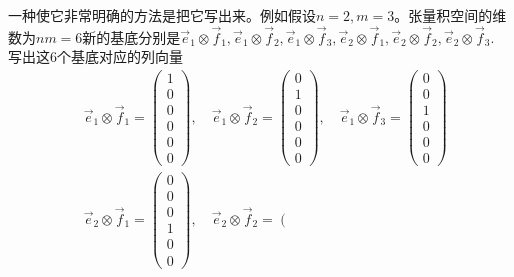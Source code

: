 \documentclass[a4paper,11pt]{article}
\begin{document}
    一种使它非常明确的方法是把它写出来。例如假设$n=2,m=3$。张量积空间的维数为$nm=6$新的基底分别是$\vec{e}_{1} \otimes \vec{f}_{1}, \vec{e}_{1} \otimes \vec{f}_{2}, \vec{e}_{1} \otimes \vec{f}_{3}, \vec{e}_{2} \otimes \vec{f}_{1}, \vec{e}_{2} \otimes \vec{f}_{2}, \vec{e}_{2} \otimes \vec{f}_{3}$. 写出这6个基底对应的列向量
    \begin{equation}
        \begin{split}
            &\vec{e}_{1} \otimes \vec{f}_{1}=\left(\begin{array}{c}
                1 \\
                0 \\
                0 \\
                \hline 0 \\
                0 \\
                0
                \end{array}\right), \quad \vec{e}_{1} \otimes \vec{f}_{2}=\left(\begin{array}{c}
                0 \\
                1 \\
                0 \\
                0 \\
                0 \\
                0
                \end{array}\right), \quad \vec{e}_{1} \otimes \vec{f}_{3}=\left(\begin{array}{c}
                0 \\
                0 \\
                1 \\
                \hline 0 \\
                0 \\
                0
                \end{array}\right)\\
                &\vec{e}_{2} \otimes \vec{f}_{1}=\left(\begin{array}{c}
                    0 \\
                    0 \\
                    0 \\
                    \hline 1 \\
                    0 \\
                    0
                    \end{array}\right), \quad \vec{e}_{2} \otimes \vec{f}_{2}=\left(\begin{array}{c}

\end{array}
\end{split}
\end{equation}
\end{document}
